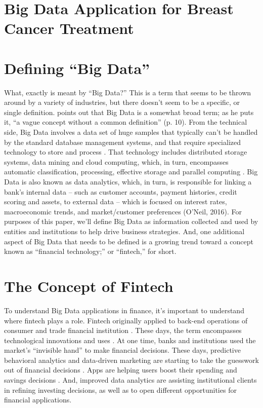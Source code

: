 \documentclass[sigconf]{acmart}
\begin{document}
\section{Big Data Application for Breast Cancer Treatment}

\setlength{\parskip}{1em}
\renewcommand{\baselinestretch}{2.0}

\section{Defining “Big Data”}

What, exactly is meant by “Big Data?” This is a term that seems to be thrown around by a variety of industries, but there doesn’t seem to be a specific, or single definition. \cite{peat2013} points out that Big Data is a somewhat broad term; as he puts it, “a vague concept without a common definition” (p. 10). From the technical side, Big Data involves a data set of huge samples that typically can’t be handled by the standard database management systems, and that require specialized technology to store and process \cite{peat2013}. That technology includes distributed storage systems, data mining and cloud computing, which, in turn, encompasses automatic classification, processing, effective storage and parallel computing \cite{peat2013}.
Big Data is also known as data analytics, which, in turn, is responsible for linking a bank’s internal data – such as customer accounts, payment histories, credit scoring and assets, to external data – which is focused on interest rates, macroeconomic trends, and market/customer preferences (O’Neil, 2016). 
For purposes of this paper, we’ll define Big Data as information collected and used by entities and institutions to help drive business strategies. And, one additional aspect of Big Data that needs to be defined is a growing trend toward a concept known as “financial technology;” or “fintech,” for short.

\section{The Concept of Fintech}

To understand Big Data applications in finance, it’s important to understand where fintech plays a role. Fintech originally applied to back-end operations of consumer and trade financial institution \cite{he2017fintech}. These days, the term encompasses technological innovations and uses \cite{he2017fintech}. At one time, banks and institutions used the market’s “invisible hand” to make financial decisions. These days, predictive behavioral analytics and data-driven marketing are starting to take the guesswork out of financial decisions \cite{he2017fintech}. Apps are helping users boost their spending and savings decisions \cite{he2017fintech}. And, improved data analytics are assisting institutional clients in refining investing decisions, as well as to open different opportunities for financial applications.
\end{document}

